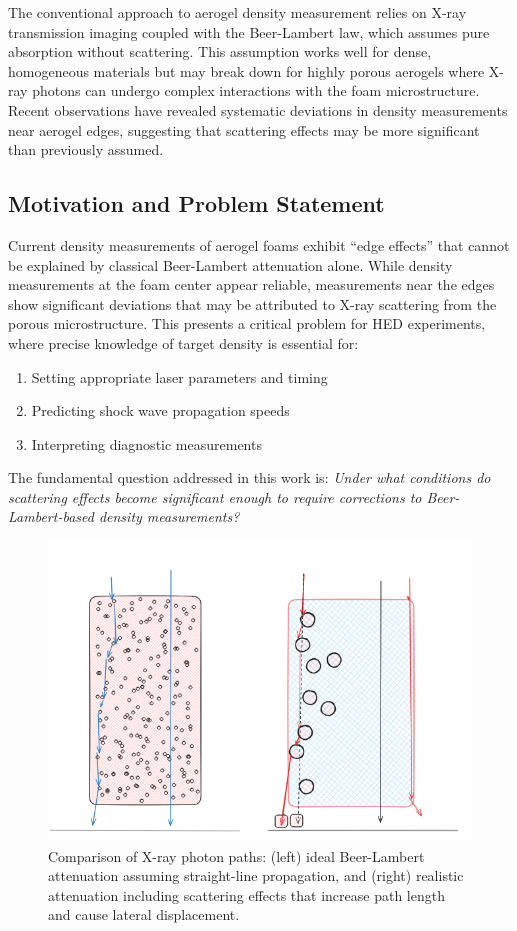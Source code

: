 \documentclass[twocolumn]{aastex701}
\begin{document}
The conventional approach to aerogel density measurement relies on X-ray transmission imaging coupled with the Beer-Lambert law, which assumes pure absorption without scattering. This assumption works well for dense, homogeneous materials but may break down for highly porous aerogels where X-ray photons can undergo complex interactions with the foam microstructure. Recent observations have revealed systematic deviations in density measurements near aerogel edges, suggesting that scattering effects may be more significant than previously assumed.

\subsection{Motivation and Problem Statement}

Current density measurements of aerogel foams exhibit ``edge effects'' that cannot be explained by classical Beer-Lambert attenuation alone. While density measurements at the foam center appear reliable, measurements near the edges show significant deviations that may be attributed to X-ray scattering from the porous microstructure. This presents a critical problem for HED experiments, where precise knowledge of target density is essential for:

\begin{enumerate}
    \item Setting appropriate laser parameters and timing
    \item Predicting shock wave propagation speeds
    \item Interpreting diagnostic measurements
\end{enumerate}

The fundamental question addressed in this work is: \textit{Under what conditions do scattering effects become significant enough to require corrections to Beer-Lambert-based density measurements?}

\begin{figure}[t]
    \centering
    \includegraphics[width=0.35\linewidth]{sidebyside.png}
    \caption{Comparison of X-ray photon paths: (left) ideal Beer-Lambert attenuation assuming straight-line propagation, and (right) realistic attenuation including scattering effects that increase path length and cause lateral displacement.}
    \label{fig:side}
\end{figure}
\end{document}
